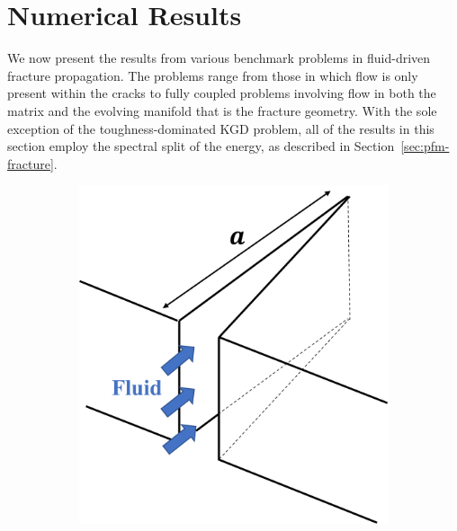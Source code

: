 
\newpage 

\section{Numerical Results}\label{results_section}

We now present the results from various benchmark problems in fluid-driven fracture propagation.  The problems range from those in which flow is only present within the cracks to fully coupled problems involving flow in both the matrix and the evolving manifold that is the fracture geometry. With the sole exception of the toughness-dominated KGD problem,  all of the results in this section employ the spectral split of the energy, as described in Section~\ref{sec:pfm-fracture}.  

\begin{figure}[!htbp]
\centering
\begin{subfigure}{.5\textwidth}
  \centering
  \includegraphics[width=.79\linewidth]{img/KGD_schematic_mine.png}
    \caption{}
    \label{fig:3D_schematics_kgd}
\end{subfigure}%
\begin{subfigure}{.5\textwidth}
  \centering

\end{subfigure}
\end{figure}
